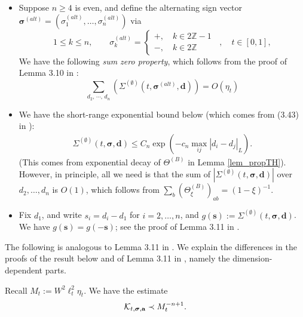 \begin{itemize}
\item Suppose $n\geq4$ is even, and define the alternating sign vector $\boldsymbol{\sigma}^{(alt)}=(\sigma^{(alt)}_{1},\ldots,\sigma^{(alt)}_{n})$ via
\begin{equation}\label{assum_SZ_SinMole}
1\le k\le n, \quad \quad {\sigma}^{(alt)}_k =\begin{cases}
    +, \quad k\in 2\mathbb Z-1
    \\\nonumber
    -, \quad k\in 2\mathbb Z 
\end{cases}\; \;,\quad t\in[0,1]  ,  
\end{equation}
We have the following \emph{sum zero property}, which follows from the proof of Lemma 3.10 in \cite{YY_25}:
\begin{equation}\label{SZjadljsk}
   \sum_{d_2,\,\cdots,\,d_n}\left(\Sigma^{(\emptyset)}(t, \boldsymbol{\sigma}^{(alt)}, \textbf{d})\right)=O(\eta_t) 
\end{equation}
\item We have the short-range exponential bound below (which comes from (3.43) in \cite{YY_25}):
\begin{align}\label{res_SIGempdd}
  \Sigma^{(\emptyset)}(t, \boldsymbol{\sigma}, \textbf{d})\le C_n\exp\left(-c_n \max_{ij}|d_i-d_j|_{L}\right)   .
\end{align}
(This comes from exponential decay of $\Theta^{(B)}$ in Lemma \ref{lem_propTH}). However, in principle, all we need is that the sum of $|\Sigma^{(\emptyset)}(t,\boldsymbol{\sigma},\textbf{d})|$ over $d_{2},\ldots,d_{n}$ is $O(1)$, which follows from $\sum_{b}(\Theta^{(B)}_{\xi})_{ab}=(1-\xi)^{-1}$. 
\item Fix $d_{1}$, and write $s_{i}=d_{i}-d_{1}$ for $i=2,\ldots,n$, and $g(\textbf{s}):=\Sigma^{(\emptyset)}(t,\boldsymbol{\sigma},\textbf{d})$. We have $g(\textbf{s})=g(-\textbf{s})$; see the proof of Lemma 3.11 in \cite{YY_25}.
\end{itemize}

The following is analogous to Lemma 3.11 in \cite{YY_25}. We explain the differences in the proofs of the result below and of Lemma 3.11 in \cite{YY_25}, namely the dimension-dependent parts.

\begin{lemma}\label{ML:Kbound+pi}
Recall $M_{t}:=W^{2}\ell_{t}^{2}\eta_{t}$. We have the estimate
\begin{equation}\label{eq:bcal_k_2}
  {\cal K}_{t, \boldsymbol{\sigma}, \textbf{a}} \prec M_{t}^{-n+1}.    
\end{equation}
\end{lemma}

